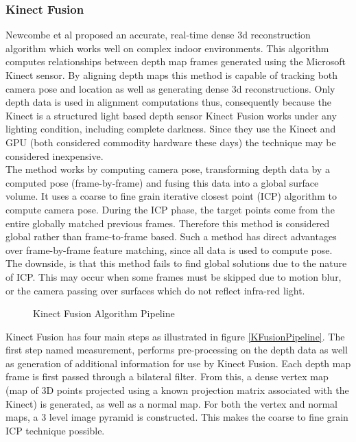 \subsubsection{Kinect Fusion}

Newcombe et al \cite{Newcombe11Kinectfusion,Izadi11Kinectfusion} proposed an accurate, real-time dense 3d reconstruction algorithm which works well on complex indoor environments. This algorithm computes relationships between depth map frames generated using the Microsoft Kinect \cite{Zhang12Microsoft} sensor. By aligning depth maps this method is capable of tracking both camera pose and location as well as generating dense 3d reconstructions. Only depth data is used in alignment computations thus, consequently because the Kinect is a structured light based depth sensor Kinect Fusion works under any lighting condition, including complete darkness. Since they use the Kinect and GPU (both considered commodity hardware these days) the technique may be considered inexpensive. \\

The method works by computing camera pose, transforming depth data by a computed pose (frame-by-frame) and fusing this data into a global surface volume. It uses a coarse to fine grain iterative closest point (ICP) algorithm to compute camera pose. During the ICP phase, the target points come from the entire globally matched previous frames. Therefore this method is considered global rather than frame-to-frame based. Such a method has direct advantages over frame-by-frame feature matching, since all data is used to compute pose. The downside, is that this method fails to find global solutions due to the nature of ICP. This may occur when some frames must be skipped due to motion blur, or the camera passing over surfaces which do not reflect infra-red light. \\

\begin{figure}[!h]
\centering
\caption{Kinect Fusion Algorithm Pipeline \cite{Newcombe11Kinectfusion}}
\label{KFusionPipeliciteHne}
\end{figure}

Kinect Fusion has four main steps as illustrated in figure \ref{KFusionPipeline}. The first step named measurement, performs pre-processing on the depth data as well as generation of additional information for use by Kinect Fusion. Each depth map frame is first passed through a bilateral filter. From this, a dense vertex map (map of 3D points projected using a known projection matrix associated with the Kinect) is generated, as well as a normal map. For both the vertex and normal maps, a 3 level image pyramid is constructed. This makes the coarse to fine grain ICP technique possible. \\

